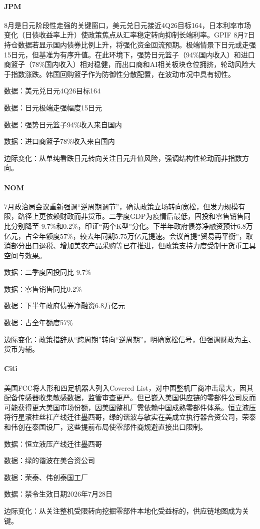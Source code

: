 \documentclass[11pt]{ctexart}
\begin{document}
\paragraph{JPM} 8月是日元阶段性走强的关键窗口，美元兑日元接近4Q26目标164，日本利率市场变化（日债收益率上升）使政策焦点从汇率稳定转向抑制长端利率。GPIF 8月7日持仓数据若显示国内债券比例上升，将强化资金回流预期。极端情景下日元或走强15日元，但基准为有序升值。在此环境下，强势日元篮子（94\%国内收入）和进口商篮子（78\%国内收入）相对稳健，而出口商和AI相关板块仓位拥挤，轮动风险大于指数涨跌。韩国回购篮子作为防御性分散配置，在波动市况中具有韧性。
{\small\color{refgray}数据：美元兑日元4Q26目标164\par}
{\small\color{refgray}数据：日元极端走强幅度15日元\par}
{\small\color{refgray}数据：强势日元篮子94\%收入来自国内\par}
{\small\color{refgray}数据：进口商篮子78\%收入来自国内\par}
{\small\color{refgray}边际变化：从单纯看跌日元转向关注日元升值风险，强调结构性轮动而非指数方向。\par}
\paragraph{NOM} 7月政治局会议重新强调“逆周期调节”，确认政策立场转向宽松，但发力规模有限，路径上更依赖财政而非货币。二季度GDP为疫情后最低，固投和零售销售同比分别降至-9.7\%和0.2\%，印证“两个K型”分化。下半年政府债券净融资预计6.8万亿元，占全年额度57\%，较去年同期5.75万亿元提速。会议首提“贸易再平衡”，取消部分出口退税、增加美农产品采购等已在推进，但政策支持力度受制于货币工具空间与效果。
{\small\color{refgray}数据：二季度固投同比-9.7\%\par}
{\small\color{refgray}数据：零售销售同比0.2\%\par}
{\small\color{refgray}数据：下半年政府债券净融资6.8万亿元\par}
{\small\color{refgray}数据：占全年额度57\%\par}
{\small\color{refgray}边际变化：政策措辞从“跨周期”转向“逆周期”，明确宽松信号，但强调财政为主、货币为辅。\par}
\paragraph{Citi} 美国FCC将人形和四足机器人列入Covered List，对中国整机厂商冲击最大，因其配备传感器收集敏感数据，监管审查更严。但已嵌入美国供应链的零部件公司反而可能获得更大美国市场份额，因美国整机厂需依赖中国成熟零部件体系。恒立液压将行星滚柱丝杠产线迁往墨西哥，绿的谐波与敏实在美成立执行器合资公司，荣泰和伟创在泰国设厂，这些提前布局使零部件商规避直接出口限制。
{\small\color{refgray}数据：恒立液压产线迁往墨西哥\par}
{\small\color{refgray}数据：绿的谐波在美合资公司\par}
{\small\color{refgray}数据：荣泰、伟创泰国工厂\par}
{\small\color{refgray}数据：禁令生效日期2026年7月28日\par}
{\small\color{refgray}边际变化：从关注整机受限转向挖掘零部件本地化受益标的，供应链地图成为关键。\par}
\end{document}
